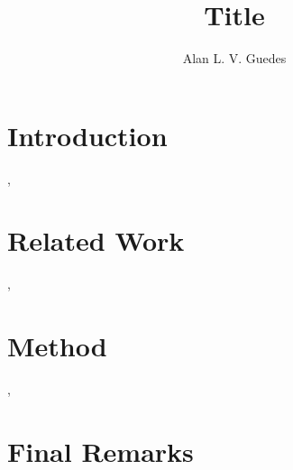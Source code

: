 \documentclass[manuscript,screen,noacm]{acmart}
\begin{document}

\title{Title}
\author{Alan L. V. Guedes}
\renewcommand{\shortauthors}{Guedes, A.L.G.}

\begin{abstract}
\lipsum[1-2]
\end{abstract}

\maketitle

\section{Introduction}
\label{sec:introduction}

\lipsum[1-2]\cite{TeXFAQ}, \cite{Downes04:amsart}

\section{Related Work}
\label{sec:related}

\lipsum[1-2]\cite{Fiorio15}, \cite{Brito09}

\section{Method}
\label{sec:method}

\lipsum[1-2]\cite{Heinz15}, \cite{Fear05}

\section{Final Remarks}
\label{sec:remarks}

\lipsum[1-2]\cite{Carlisle04:Textcase,Braams22:Babel}



\end{document}
